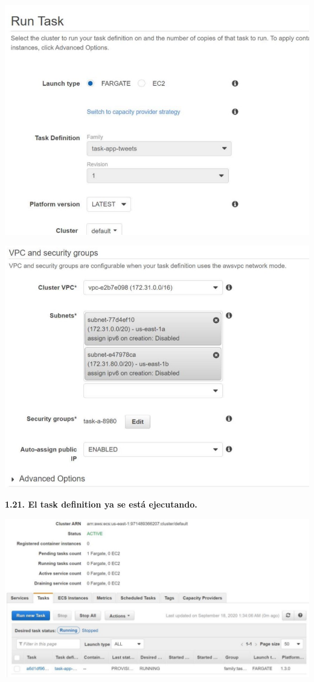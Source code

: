 \documentclass{article}
\begin{document}
    \begin{center}
		\includegraphics[width=15cm]{./images/22} 
	\end{center}
	
    \begin{center}
		\includegraphics[width=15cm]{./images/23} 
	\end{center}
	
	
		\textbf{1.21. El task definition ya se está ejecutando.}

    \begin{center}
		\includegraphics[width=15cm]{./images/24} 
	\end{center}
	
\end{document}
